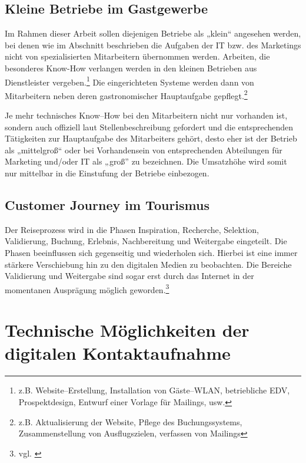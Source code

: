 \subsection{Kleine Betriebe im Gastgewerbe} %
\label{sub:kleine_betriebe_im_gastgewerbe}
Im Rahmen dieser Arbeit sollen diejenigen Betriebe als „klein“ angesehen werden, bei denen wie im Abschnitt  beschrieben die Aufgaben der IT bzw. des Marketings nicht von spezialisierten Mitarbeitern übernommen werden. Arbeiten, die besonderes Know-How verlangen werden in den kleinen Betrieben aus Dienstleister vergeben.\footnote{z.B. Website–Erstellung, Installation von Gäste–WLAN, betriebliche EDV, Prospektdesign, Entwurf einer Vorlage für Mailings, usw.} Die eingerichteten Systeme werden dann von Mitarbeitern neben deren gastronomischer Hauptaufgabe gepflegt.\footnote{z.B. Aktualisierung der Website, Pflege des Buchungssystems, Zusammenstellung von Ausflugszielen, verfassen von Mailings}

Je mehr technisches Know–How bei den Mitarbeitern nicht nur vorhanden ist, sondern auch offiziell laut Stellenbeschreibung gefordert und die entsprechenden Tätigkeiten zur Hauptaufgabe des Mitarbeiters gehört, desto eher ist der Betrieb als „mittelgroß“ oder bei Vorhandensein von entsprechenden Abteilungen für Marketing und/oder IT als „groß” zu bezeichnen. Die Umsatzhöhe wird somit nur mittelbar in die Einstufung der Betriebe einbezogen.

\subsection{Customer Journey im Tourismus} %
\label{sub:customer_journey_im_tourismus}
Der Reiseprozess wird in die Phasen Inspiration, Recherche, Selektion, Validierung, Buchung, Erlebnis, Nachbereitung und Weitergabe eingeteilt. Die Phasen beeinflussen sich gegenseitig und wiederholen sich.
Hierbei ist eine immer stärkere Verschiebung hin zu den digitalen Medien zu beobachten. Die Bereiche Validierung und Weitergabe sind sogar erst durch das Internet in der momentanen Ausprägung möglich geworden.\footnote{vgl. \cite{buhl}}





\newpage
\section{Technische Möglichkeiten der digitalen Kontaktaufnahme} %
\label{sec:technologien}

